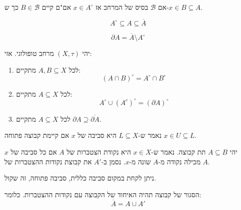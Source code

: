 \documentclass{tstextbook}
\begin{document}
\begin{proposition}
אם \(\mathcal{B}\) בסיס של המרחב אז \(x \in A^{\circ}\) אם"ם קיים \(B \in \mathcal{B}\) כך ש-\(x \in B\subseteq A\).

\end{proposition}
\begin{proposition}
$$A^{\circ }\subseteq A\subseteq \overline{A} $$

\end{proposition}
\begin{definition}
$$\partial A=\overline{A} \setminus  A^{\circ }$$

\end{definition}
\begin{proposition}
יהי \((X,\tau)\) מרחב טופולוגי. אזי:

  \begin{enumerate}
    \item לכל \(A,B \subseteq X\) מתקיים: 
$$(A\cap  B)^{\circ }=A^{\circ }\cap  B^{\circ }$$


    \item לכל \(A\subseteq X\) מתקיים: 
$$A^{\circ }\cup  (A^{c})^{\circ }=(\partial A)^{\circ }$$


    \item לכל \(A\subseteq X\) מתקיים \(\partial A \supseteq \overline{\partial A}\). 


  \end{enumerate}
\end{proposition}
\begin{definition}
נאמר ש-\(L\subseteq X\) היא סביבה של \(x\) אם קיימת קבוצה פתוחה \(x \in U \subseteq L\).

\end{definition}
\begin{definition}
יהי \(A \subseteq B\) תת קבוצה. נאמר ש-\(x \in X\) היא נקודת הצטברות של \(A\) אם כל סביבה של \(x\) מכילה נקודה מ-\(A\) שונה מ-\(x\). נסמן ב-\(A'\) את קבוצת נקודות ההצטברות של \(A\).

\end{definition}
\begin{remark}
ניתן לקחת במקום סביבה כללית, סביבה פתוחה, זה שקול.

\end{remark}
\begin{proposition}
הסגור של קבוצה תהיה האיחוד של הקבוצה עם נקודות ההצטברות. כלומר:
$$\overline{A} =A\cup  A'$$

\end{proposition}
\end{document}
